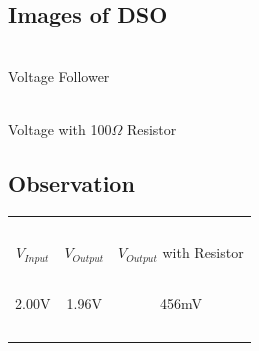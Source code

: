 \documentclass{article}
\begin{document}
\subsection{Images of DSO}
\vspace{5px}
\begin{multicols}{2}
\begin{center}
 \\ \vspace{5px}
Voltage Follower\\

\columnbreak

 \\ \vspace{5px}
Voltage with 100$\Omega$ Resistor 
\end{center}
\end{multicols}

\subsection{Observation}
\vspace{5px}
\begin{center}
\begin{tabular}{| c | c | c |} 
 \hline
    \ & \ & \ \\
    $V_{Input}$ & $V_{Output}$ & $V_{Output}$ with Resistor \\ [1em]
    \hline
    \ & \ & \ \\
    2.00V & 1.96V & 456mV \\
    \ & \ & \ \\
 \hline
\end{tabular}
\end{center}
\end{document}

